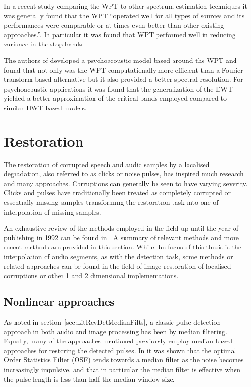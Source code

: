 In a recent study comparing the WPT to other spectrum estimation techniques it was generally found that the WPT ``operated well for all types of sources and its performances were comparable or at times even better than other existing \linebreak[0]approaches.''\cite{Ariananda2013}. In particular it was found that WPT performed well in reducing variance in the stop bands.

The authors of \cite{He2008} developed a psychoacoustic model based around the WPT and found that not only was the WPT computationally more efficient than a Fourier transform-based alternative but it also provided a better spectral resolution. For psychoacoustic applications it was found that the generalization of the DWT yielded a better approximation of the critical bands employed\cite{Carnero1999}\cite{He2008} compared to similar DWT based models\cite{Sinha1993}\cite{Zurera2001}.

\section{Restoration}\label{sec:LitRev_Restoration}
The restoration of corrupted speech and audio samples by a localised degradation, also referred to as clicks or noise pulses, has inspired much research and many approaches. Corruptions can generally be seen to have varying severity. Clicks and pulses have traditionally been treated as completely corrupted or essentially missing samples transforming the restoration task into one of interpolation of missing samples\cite{Tukey1974}\cite{Tukey1977}\cite{Godsill1998book}.

An exhaustive review of the methods employed in the field up until the year of publishing in 1992 can be found in \cite{Veldhuis1992}. A summary of relevant methods and more recent methods are provided in this section. While the focus of this thesis is the interpolation of audio segments, as with the detection task, some methods or related approaches can be found in the field of image restoration of localised corruptions or other 1 and 2 dimensional implementations.

\subsection{Nonlinear approaches}\label{sec:LitRev_RestorationNonLin}
As noted in section~\ref{sec:LitRevDetMedianFilts}, a classic pulse detection approach in both audio and image processing has been by median filtering. Equally, many of the approaches mentioned previously employ median based approaches for restoring the detected pulses\cite{Tukey1974}\cite{Lee1985}\cite{Heinonen1985}\cite{Heinonen1987}\cite{Maekivirta1991}\cite{Kasparis1993}\cite{Alajlan2004}. In \cite{Bovik1983} it was shown that the optimal Order Statistics Filter (OSF) tends towards a median filter as the noise becomes increasingly impulsive, and that in particular the median filter is effective when the pulse length is less than half the median window size\cite{Alajlan2004}.

